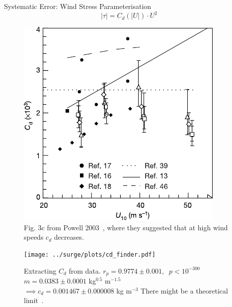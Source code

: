 \begin{frame}{Systematic Error: Wind Stress Parameterisation}
\vspace{-40pt}
\centering
\begin{equation}
 |\tau| = C_d(|U|) \cdot U^2
 \end{equation}
    \hspace{-30pt}\begin{minipage}{0.45\textwidth}
    \begin{figure}
            \includegraphics[width=1\linewidth]{images/example-images/cd.pdf}
                \caption{Fig. 3c from Powell 2003~\cite{powell2003reduced},
                 where they suggested that at high wind speeds $c_d$ decreases.}
    \end{figure}
    \end{minipage}\hspace{5pt}
      \begin{minipage}{0.57\textwidth}
\begin{figure}[htb!]
    \centering
    \texttt{[image: ../surge/plots/cd\_finder.pdf]}
    \caption{ Extracting $C_d$ from data.
    $ r_p = 0.9774 \pm 0.001,\;\; p<10^{-300}$\\
    $ m = 0.0383 \pm 0.0001 $ kg$^{0.5}$ m$^{-1.5}$\\
    $\implies  c_d = 0.001467 \pm 0.000008$ kg m$^{-3}$
    There might be a theoretical limit~\cite{donelan2004limiting}.
    }
\end{figure}
    \end{minipage}
\end{frame}
